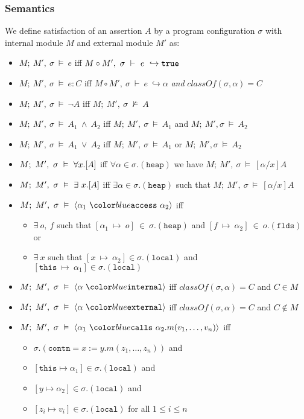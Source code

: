\documentclass[acmsmall,review,anonymous]{acmart}\settopmatter{printfolios=true,printccs=false,printacmref=false}
\begin{document}
\subsubsection{Semantics}
\begin{definition} 
We define satisfaction of an assertion $A$ by a program configuration $\sigma$ with internal module $M$ and external module $M'$ as:
\begin{itemize}
\item
$M;\ M',\ \sigma\ \vDash\ e$ iff $M \circ M',\ \sigma\ \vdash\ e\ \hookrightarrow \true$
\item
$M;\ M',\ \sigma\ \vDash\ e : C$ iff $M \circ M',\ \sigma\ \vdash\ e\ \hookrightarrow \alpha$ \textit{and} $\textit{classOf}(\sigma, \alpha) = C$
\item
$M;\ M',\ \sigma\ \vDash\ \neg A$ iff $M;\ M',\ \sigma\ \not\vDash\ A$
\item
$M;\ M',\ \sigma\ \vDash\ A_1\ \wedge\ A_2$ iff $M;\ M',\ \sigma\ \vDash\ A_1$ and $M;\ M', \sigma\ \vDash\ A_2$
\item
$M;\ M',\ \sigma\ \vDash\ A_1\ \vee\ A_2$ iff $M;\ M',\ \sigma\ \vDash\ A_1$ or $M;\ M', \sigma\ \vDash\ A_2$
\item
$M;\ M',\ \sigma\ \vDash\ \all{x}{A}$ iff $\forall \alpha \in \sigma.(\texttt{heap})$ we have $M;\ M',\ \sigma\ \vDash\ [\alpha/x]A$
\item
$M;\ M',\ \sigma\ \vDash\ \ex{x}{A}$ iff $\exists \alpha \in \sigma.(\texttt{heap})$ such that $M;\ M',\ \sigma\ \vDash\ [\alpha/x]A$
\item
$M;\ M',\ \sigma\ \vDash\ \access{\alpha_1}{\alpha_2}$ iff 
\begin{itemize}
\item
$\exists\ o,\ f$ such that $[\alpha_1\ \mapsto\ o]\ \in\ \sigma.(\texttt{heap})$ and $[f\ \mapsto\ \alpha_2]\ \in\ o.(\texttt{flds})$ or
\item
$\exists\ x$ such that $[x\ \mapsto\ \alpha_2]\in\sigma.(\texttt{local})$ and $[\texttt{this}\ \mapsto\ \alpha_1]\in\sigma.(\texttt{local})$
\end{itemize}
\item
$M;\ M',\ \sigma\ \vDash\ \internal{\alpha}$ iff $\textit{classOf}(\sigma,\alpha) = C$ and $C \in M$
\item
$M;\ M',\ \sigma\ \vDash\ \external{\alpha}$ iff $\textit{classOf}(\sigma,\alpha) = C$ and $C \not\in M$
\item
$M;\ M',\ \sigma\ \vDash\ \calls{\alpha_1}{\alpha_2}{m}{v_1, \ldots, v_n}$ iff
\begin{itemize}
\item
$\sigma.(\texttt{contn} = x := y.m(z_1,\ldots,z_n))$ and 
\item
$[\texttt{this}\mapsto \alpha_1]\in\sigma.(\texttt{local})$ and
\item
$[y\mapsto \alpha_2]\in\sigma.(\texttt{local})$ and
\item
$[z_i\mapsto v_i]\in\sigma.(\texttt{local})$ for all $1 \leq i \leq n$
\end{itemize}
\end{itemize}
\end{definition}
\end{document}
